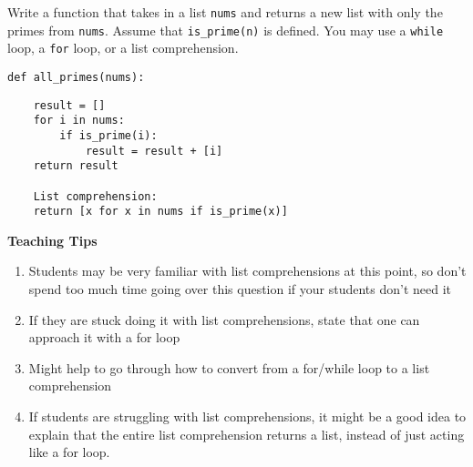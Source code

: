 \begin{blocksection}
\question Write a function that takes in a list \lstinline{nums} and returns a
new list with only the primes from \lstinline{nums}. Assume that
\lstinline{is_prime(n)} is defined. You may use a \lstinline{while} loop, a
\lstinline{for} loop, or a list comprehension.


\begin{lstlisting}
def all_primes(nums):
\end{lstlisting}

\begin{solution}[2in]
\begin{lstlisting}
    result = []
    for i in nums:
        if is_prime(i):
            result = result + [i]
    return result

    List comprehension:
    return [x for x in nums if is_prime(x)]
\end{lstlisting}
\end{solution}
\end{blocksection}

\begin{questionmeta}
    \textbf{Teaching Tips}
    \begin{enumerate}
            \item Students may be very familiar with list comprehensions at this point, so don’t spend too much time going over this question if your students don’t need it
            \item If they are stuck doing it with list comprehensions, state that one can approach it with a for loop
            \item Might help to go through how to convert from a for/while loop to a list comprehension
            \item If students are struggling with list comprehensions, it might be a good idea to explain that the entire list comprehension returns a list, instead of just acting like a for loop.
    \end{enumerate}
\end{questionmeta}